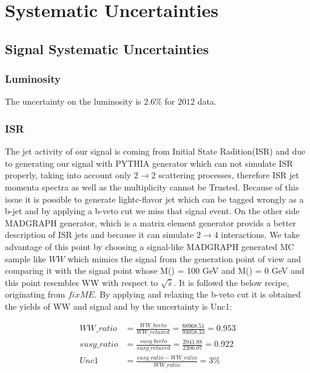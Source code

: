 \section{Systematic Uncertainties}
\label{sect:sys}
\subsection{Signal Systematic Uncertainties}
\subsubsection{Luminosity}
The uncertainty on the luminosity  is $2.6\%$ for $2012$ data.

\subsubsection{ISR}
The jet activity of our signal is coming from Initial State Radition(ISR) and due to generating our signal with PYTHIA generator which can not simulate ISR properly, taking into account only $2 \rightarrow 2$ scattering processes, therefore ISR jet momenta spectra as well as the multiplicity cannot be Trusted. Because of this issue it is possible to generate lightc-flavor jet which can be tagged wrongly as a b-jet and by applying a b-veto cut we miss that signal event. On the other side MADGRAPH generator, which is a matrix element generator provids a better description of ISR jets and because it can simulate $2 \rightarrow 4$ interactions. 
We take advantage of this point by choosing a signal-like MADGRAPH generated MC sample like $WW$ which mimics the signal from the generation point of view and comparing it with the signal point whose M(\chione) = 100 GeV and M(\nuetraliono) = 0 GeV and this point resembles WW with respect to $\sqrt {\hat{s}}$. It is followd the below recipe, originating from $fixME$.
By applying and relaxing the b-veto cut it is obtained the yields of WW and signal and by the uncertainty is Unc1:


\begin{align}
WW\_ratio &= \frac{WW\_bveto}{WW\_relaxed} = \frac{88968.51}{93058.33} = 0.953\\ \nonumber
susy\_ratio &= \frac{susy\_bveto}{susy\_relaxed} = \frac{2041.88}{2206.07} = 0.922 \\ \nonumber
Unc1 &= \frac{susy\_ratio - WW\_ratio}{WW\_ratio} = 3 \% 
\end{align}

